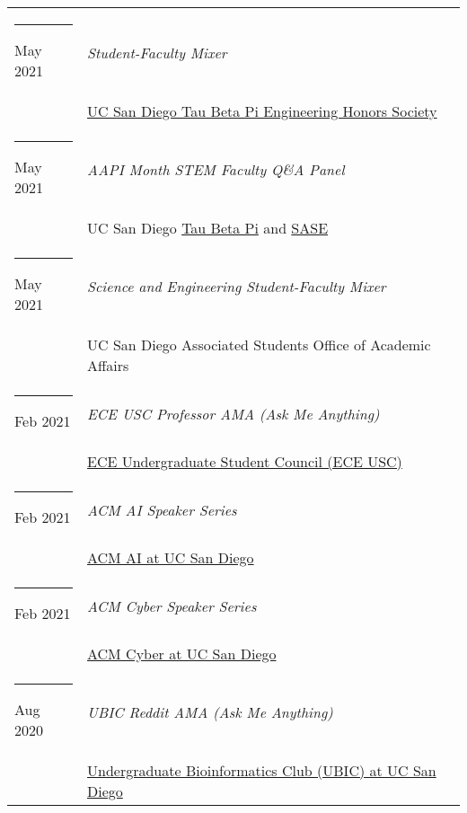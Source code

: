 \documentclass[margin,line]{res}
\begin{document}
\begin{resume}
\begin{longtable}{@{}p{0.7in}p{4in}}
\hspace*{-4mm} \rule{-1mm}{5mm} May 2021 & \textit{Student-Faculty Mixer}\\*
\hspace*{-4mm} & \hspace{4mm} \href{https://tbp.ucsd.edu/home}{UC San Diego Tau Beta Pi Engineering Honors Society}\\
\hspace*{-4mm} \rule{-1mm}{5mm} May 2021 & \textit{AAPI Month STEM Faculty Q\&A Panel}\\*
\hspace*{-4mm} & \hspace{4mm} UC San Diego \href{https://tbp.ucsd.edu/home}{Tau Beta Pi} and \href{https://saseatucsd.weebly.com/}{SASE}\\
\hspace*{-4mm} \rule{-1mm}{5mm} May 2021 & \textit{Science and Engineering Student-Faculty Mixer}\\*
\hspace*{-4mm} & \hspace{4mm} UC San Diego Associated Students Office of Academic Affairs\\
\hspace*{-4mm} \rule{-1mm}{5mm} Feb 2021 & \textit{ECE USC Professor AMA (Ask Me Anything)}\\*
\hspace*{-4mm} & \hspace{4mm} \href{https://eceusc.ucsd.edu/}{ECE Undergraduate Student Council (ECE USC)}\\
\hspace*{-4mm} \rule{-1mm}{5mm} Feb 2021 & \textit{ACM AI Speaker Series}\\*
\hspace*{-4mm} & \hspace{4mm} \href{https://ai.acmucsd.com/}{ACM AI at UC San Diego}\\
\hspace*{-4mm} \rule{-1mm}{5mm} Feb 2021 & \textit{ACM Cyber Speaker Series}\\*
\hspace*{-4mm} & \hspace{4mm} \href{https://www.facebook.com/cyberucsd}{ACM Cyber at UC San Diego}\\
\hspace*{-4mm} \rule{-1mm}{5mm} Aug 2020 & \textit{UBIC Reddit AMA (Ask Me Anything)}\\*
\hspace*{-4mm} & \hspace{4mm} \href{http://ubicucsd.github.io/}{Undergraduate Bioinformatics Club (UBIC) at UC San Diego}\\

\end{longtable}
\end{resume}
\end{document}
